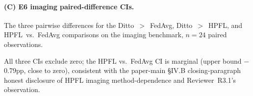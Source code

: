 \documentclass[conference]{IEEEtran}
\begin{document}
\begin{table}[htbp]
\centering
\caption{Bootstrap 95\% CI for the four DEI Spearman correlation claims of the paper-original. The DEI--min-recall correlation $\rho{=}+$0.969 is the most statistically robust headline.}
\label{tab:pre_rebuttal_bootstrap_dei}
\small
\setlength{\tabcolsep}{4pt}
\end{table}

\paragraph{(C) E6 imaging paired-difference CIs.} The three pairwise differences for the Ditto~$>$~FedAvg, Ditto~$>$~HPFL, and HPFL~vs.\ FedAvg comparisons on the imaging benchmark, $n{=}24$ paired observations.

\begin{table}[htbp]
\centering
\caption{Bootstrap 95\% CI for E6 imaging pairwise differences, $n{=}24$ paired observations.}
\label{tab:pre_rebuttal_bootstrap_e6}
\small
{}

\vspace{1mm}
\footnotesize{All three CIs exclude zero; the HPFL vs.\ FedAvg CI is marginal (upper bound $-$0.79pp, close to zero), consistent with the paper-main §IV.B closing-paragraph honest disclosure of HPFL imaging method-dependence and Reviewer~R3.1's observation.}
\end{table}
\end{document}
